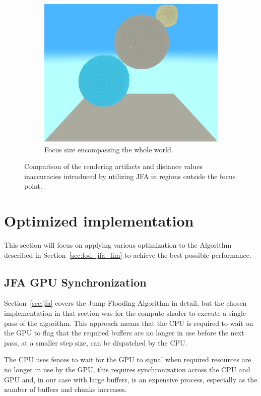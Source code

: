 \begin{figure}[htbp]
    \begin{subfigure}[t]{0.32\textwidth}
        \centering
        \includegraphics[width=\textwidth]{figures/hybrid_focus_3.png}
        \caption{Focus size encompassing the whole world.}
    \end{subfigure}
    \caption{Comparison of the rendering artifacts and distance values inaccuracies introduced by utilizing JFA in regions
        outside the focus point.}
    \label{fig:focus_size_artifacts}
\end{figure}

\section{Optimized implementation}
This section will focus on applying various optimization to the Algorithm described in Section~\ref{sec:lod_jfa_fim} to
achieve the best possible performance.

\subsection{JFA GPU Synchronization} \label{sec:jfa_gpu}
Section~\ref{sec:jfa} covers the Jump Flooding Algorithm in detail, but the chosen implementation in that section was for
the compute shader to execute a single pass of the algorithm. This approach means that the CPU is required to wait on the
GPU to flag that the required buffers are no longer in use before the next pass, at a smaller step size, can be
dispatched by the CPU.

The CPU uses fences to wait for the GPU to signal when required resources are no longer in use by the GPU, this requires
synchronization across the CPU and GPU and, in our case with large buffers, is an expensive process, especially as the
number of buffers and chunks increases.

